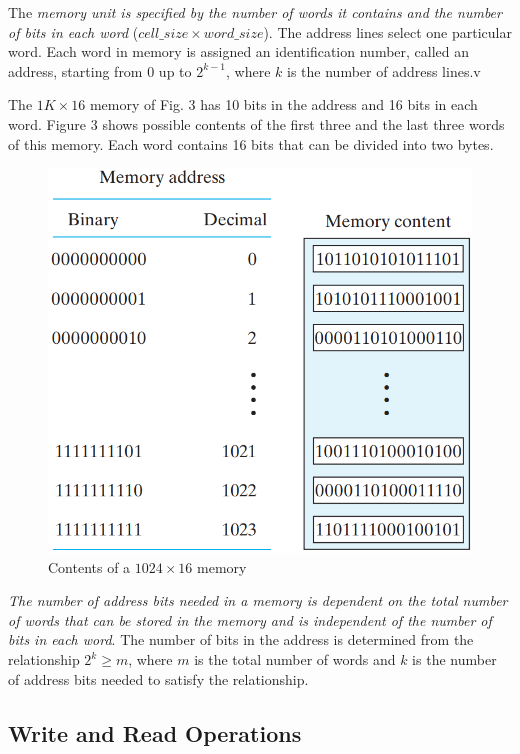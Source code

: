 The \textit{memory unit is specified by the number of words it contains and the number of bits in each word} ($cell\_size \times word\_size$). The address lines select one particular word. Each word in memory is assigned an identification number, called an address, starting from 0 up to $2^{k - 1}$, where $k$ is the number of address lines.v

The $1K \times 16$ memory of Fig. 3 has 10 bits in the address and 16 bits in each word. Figure 3 shows possible contents of the first three and the last three words of this memory. Each word contains 16 bits that can be divided into two bytes.
\begin{figure}[H]
  \centering
  \includegraphics[width=\linewidth]{img/fig-7.3.png}
  \caption{Contents of a $1024 \times 16$ memory}
  \label{fig:7.3}
\end{figure}
\textit{The number of address bits needed in a memory is dependent on the total number of words that can be stored in the memory and is independent of the number of bits in each word}. The number of bits in the address is determined from the relationship $2^k \geq m$, where $m$ is the total number of words and $k$ is the number of address bits needed to satisfy the relationship.


\subsection{Write and Read Operations}
\label{subsec:write-read-operations}

